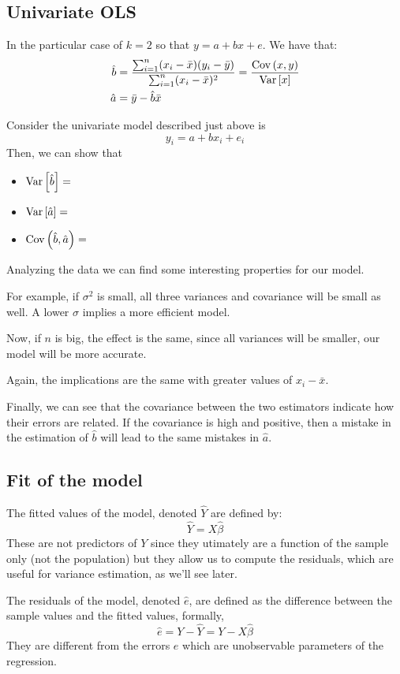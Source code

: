 \subsection{Univariate OLS}

\begin{proposition}
In the particular case of $k=2$ so that $y = a + bx +e$. We have that: \begin{align*}
\hat b & = \frac{\sum_{i=1}^{n}(x_i - \bar x)(y_i - \bar y)}{\sum_{i=1}^{n}(x_i - \bar x)^2}  = \frac{\operatorname{Cov}\left(x,y\right)}{\operatorname{Var}\left[x\right]}\\
\hat a & = \bar y - \hat b \bar x
\end{align*}
\end{proposition}

Consider the univariate model described just above is $$y_i = a + bx_i + e_i$$
Then, we can show that \begin{itemize}
\item $\operatorname{Var}\left[\hat b\right] = $
\item $\operatorname{Var}\left[\hat a\right] = $
\item $\operatorname{Cov}\left(\hat b, \hat a\right) = $
\end{itemize}
Analyzing the data we can find some interesting properties for our model.

For example, if $\sigma^2$ is small, all three variances and covariance will be small as well. A lower $\sigma$ implies a more efficient model.

Now, if $n$ is big, the effect is the same, since all variances will be smaller, our model will be more accurate.

Again, the implications are the same with greater values of $x_i - \bar x$.

Finally, we can see that the covariance between the two estimators indicate how their errors are related. If the covariance is high and positive, then a mistake in the estimation of $\hat b$ will lead to the same mistakes in $\hat a$.

\subsection{Fit of the model}

\begin{definition}
The fitted values of the model, denoted $\hat{Y}$ are defined by: $$\hat{Y} = X\hat{\beta}$$ These are not predictors of $Y$ since they utimately are a function of the sample only (not the population) but they allow us to compute the residuals, which are useful for variance estimation, as we'll see later. 

The residuals of the model, denoted $\hat{e}$, are defined as the difference between the sample values and the fitted values, formally,
$$\hat{e} = Y - \hat{Y} = Y - X\hat{\beta} $$ They are different from the errors $e$ which are unobservable parameters of the regression.
\end{definition}


